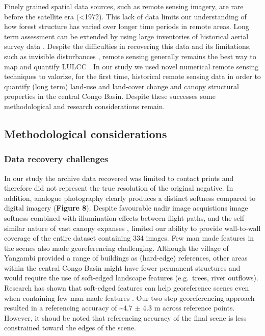 \documentclass[remote sensing,article,submit,moreauthors,pdftex]{mdpi}
\begin{document}
Finely grained spatial data sources, such as remote sensing imagery, are
rare before the satellite era (\textless{}1972). This lack of data
limits our understanding of how forest structure has varied over longer
time periods in remote areas. Long term assessment can be extended by
using large inventories of historical aerial survey data
\citep{kadmon1999, song2015, nita2018}. Despite the difficulties in
recovering this data and its limitations, such as invisible disturbances
\citep{peres2006}, remote sensing generally remains the best way to map
and quantify LULCC \citep{houghton2012}. In our study we used novel
numerical remote sensing techniques to valorize, for the first time,
historical remote sensing data in order to quantify (long term) land-use
and land-cover change and canopy structural properties in the central
Congo Basin. Despite these successes some methodological and research
considerations remain.

\hypertarget{methodological-considerations}{%
\subsection{Methodological
considerations}\label{methodological-considerations}}

\hypertarget{data-recovery-challenges}{%
\subsubsection{Data recovery
challenges}\label{data-recovery-challenges}}

In our study the archive data recovered was limited to contact prints
and therefore did not represent the true resolution of the original
negative. In addition, analogue photography clearly produces a distinct
softness compared to digital imagery (\textbf{Figure 8}). Despite
favourable nadir image acquistions \citep{verhoeven2017} image softness
combined with illumination effects between flight paths, and the
self-similar nature of vast canopy expanses
\citep{park2019, simini2010, sole1995}, limited our ability to provide
wall-to-wall coverage of the entire dataset containing 334 images. Few
man made features in the scenes also made georeferencing challenging.
Although the village of Yangambi provided a range of buildings as
(hard-edge) references, other areas within the central Congo Basin might
have fewer permanent structures and would require the use of soft-edged
landscape features (e.g.~trees, river outflows). Research has shown that
soft-edged features can help georeference scenes even when containing
few man-made features \citep{hughes2006}. Our two step georeferencing
approach resulted in a referencing accuracy of \textasciitilde{}4.7
\(\pm\) 4.3 m across reference points. However, it shoud be noted that
referencing accuracy of the final scene is less constrained toward the
edges of the scene.
\end{document}
